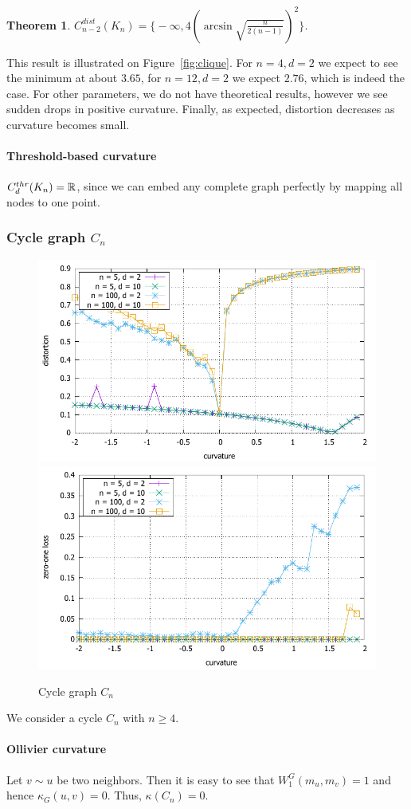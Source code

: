 \documentclass{article} %
\newtheorem{theorem}{Theorem}[section]
\begin{document}
\begin{theorem}\label{thm:clique_distortion}
$C_{n-2}^{dist}(K_n) = \bigg\{-\infty,  4 \left(\arcsin \sqrt{\frac{n}{2(n-1)}}\right)^2\bigg\}$.
\end{theorem}

This result is illustrated on Figure~\ref{fig:clique}. For $n = 4, d = 2$ we expect to see the minimum at about $3.65$, for $n = 12, d = 2$ we expect $2.76$, which is indeed the case. For other parameters, we do not have theoretical results, however we see sudden drops in positive curvature. Finally, as expected, distortion decreases as curvature becomes small. 

\paragraph{Threshold-based curvature} 
$C_d^{thr}(K_n) = \mathbb{R}$, since we can embed any complete graph perfectly by mapping all nodes to one point. 

\subsubsection{Cycle graph $C_n$} 

\begin{figure}
    \centering
    \includegraphics[width = 0.49 \textwidth]{cycle_distortion.pdf}
    \includegraphics[width = 0.49 \textwidth]{cycle_zero_one.pdf}
    \caption{Cycle graph $C_{n}$}
    \label{fig:cycle}
\end{figure}

We consider a cycle $C_n$ with $n \ge 4$.

\paragraph{Ollivier curvature}  
Let $v \sim u$ be two neighbors. Then it is easy to see that $W_1^G(m_u,m_v) = 1$ and hence $\kappa_G(u,v) = 0$. Thus, $\kappa(C_n) = 0$.
\end{document}
